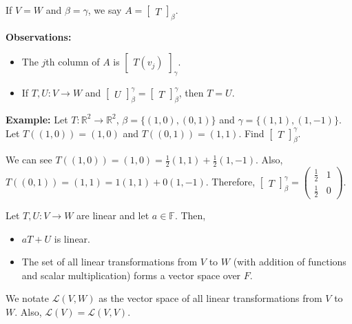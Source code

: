 \documentclass[12pt]{article}
\newenvironment{theorem}[2][Theorem]{\begin{trivlist}
\item[\hskip \labelsep {\bfseries #1}\hskip \labelsep {\bfseries #2.}]}{\end{trivlist}}
\begin{document}
\noindent If $V = W$ and $\beta = \gamma$, we say $A = \begin{bmatrix} T \end{bmatrix}_\beta$.

\vspace{1em}

\noindent \textbf{Observations:}

\begin{itemize}
    \item The $j$th column of $A$ is $\begin{bmatrix} T(v_j) \end{bmatrix}_\gamma$.
    \item If $T,U : V \to W$ and $\begin{bmatrix} U \end{bmatrix}_\beta^\gamma = \begin{bmatrix} T \end{bmatrix}_\beta^\gamma$, then $T = U$.
\end{itemize}

\noindent\textbf{Example:} Let $T : \mathbb{R}^2 \to \mathbb{R}^2$, $\beta = \{(1, 0), (0, 1)\}$ and $\gamma = \{(1,1),(1,-1)\}$. Let $T((1,0)) = (1,0)$ and $T((0,1)) = (1,1)$. Find $\begin{bmatrix}
T
\end{bmatrix}_\beta^\gamma$.

We can see $T((1,0)) = (1,0) = \frac{1}{2}(1,1) + \frac{1}{2}(1,-1)$. Also, $T((0,1)) = (1,1) = 1(1,1) + 0(1,-1)$. Therefore, $\begin{bmatrix}
T
\end{bmatrix}_\beta^\gamma = \begin{pmatrix}
\frac{1}{2} & 1 \\ \frac{1}{2} & 0
\end{pmatrix}$.

\begin{theorem}{2.7}
Let $T,U : V \to W$ are linear and let $a \in \mathbb{F}$. Then,

\begin{itemize}
    \item $aT + U$ is linear.
    \item The set of all linear transformations from $V$ to $W$ (with addition of functions and scalar multiplication) forms a vector space over $F$.
\end{itemize}
\end{theorem}

\noindent We notate $\mathcal{L}(V,W)$ as the vector space of all linear transformations from $V$ to $W$. Also, $\mathcal{L}(V) = \mathcal{L}(V,V)$.
\end{document}

